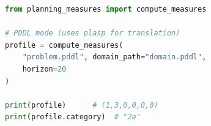\begin{lstlisting}[caption={Library usage example.},label={lst:api},language=Python]
from planning_measures import compute_measures

# PDDL mode (uses plasp for translation)
profile = compute_measures(
    "problem.pddl", domain_path="domain.pddl",
    horizon=20
)

print(profile)      # (1,3,0,0,0,0)
print(profile.category)  # "2a"
\end{lstlisting}
